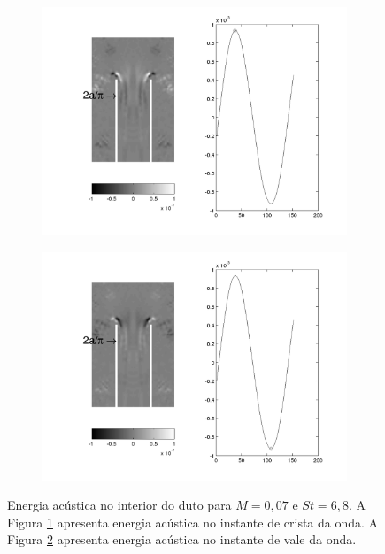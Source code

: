 \newpage
\vfill

 \begin{figure}[ht!]
 \begin{subfigure}{0.9 \textwidth}
   \includegraphics[width=1.\linewidth]{figuras/min_007_1.png}
   \caption[]{}
   \label{fig:min_007_1}
 \end{subfigure}\par\medskip
 \begin{subfigure}{0.9 \textwidth}
   \includegraphics[width=1.\linewidth]{figuras/min_007_3.png}
   \caption[]{}
   \label{fig:min_007_3}
 \end{subfigure}\par\medskip
 \caption[Energia acústica para $M = 0,07$ e $St = 6,8$.]{Energia acústica no interior do duto para $M = 0,07$ e $St = 6,8$. A Figura \ref{fig:min_007_1} apresenta energia acústica no instante de crista da onda. A Figura \ref{fig:min_007_3} apresenta energia acústica no instante de vale da onda.}
 \label{fig:min_007}
 \end{figure}

